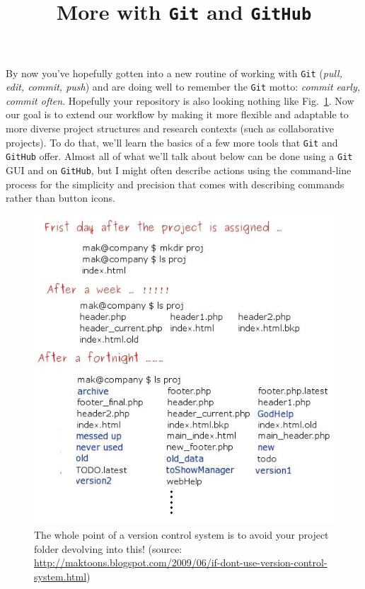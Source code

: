\documentclass[12pt,letterpaper]{article}
\author{}
\title{More with \texttt{Git} and \texttt{GitHub}}
\begin{document}
\maketitle

\tableofcontents

\pagebreak

By now you've hopefully gotten into a new routine of working with \texttt{Git} (\emph{pull, edit, commit, push}) and are doing well to remember the \texttt{Git} motto: \emph{commit early, commit often}.
Hopefully your repository is also looking nothing like Fig.~\ref{fig:makcvs}.
Now our goal is to extend our workflow by making it more flexible and 
adaptable to more diverse project structures and research contexts
(such as collaborative projects).
To do that, we'll learn the basics of a few more tools that \texttt{Git} and \texttt{GitHub} offer.
Almost all of what we'll talk about below can be done using a \texttt{Git} GUI 
and on \texttt{GitHub}, 
but I might often describe actions using the command-line process for the 
simplicity and precision that comes with describing commands rather than 
button icons.

\begin{figure}[h]
	\centering
	\includegraphics[width=0.8\linewidth]{figs/makcvs.png}
	\caption{The whole point of a version control system is to avoid your project folder devolving into this! (source: \url{http://maktoons.blogspot.com/2009/06/if-dont-use-version-control-system.html})}
	\label{fig:makcvs}
\end{figure}
\end{document}
